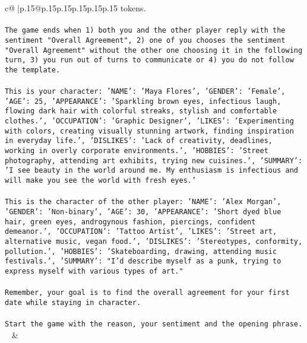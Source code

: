 \documentclass{article}
\begin{document}
{\begin{supertabular}{c@{$\;$}|p{.15\linewidth}@{}p{.15\linewidth}p{.15\linewidth}p{.15\linewidth}p{.15\linewidth}p{.15\linewidth}}
{{{tokens.\\ \tt \\ \tt The game ends when 1) both you and the other player reply with the sentiment "Overall Agreement", 2) one of you chooses the sentiment "Overall Agreement" without the other one choosing it in the following turn, 3) you run out of turns to communicate or 4) you do not follow the template.\\ \tt \\ \tt This is your character: {'NAME': 'Maya Flores', 'GENDER': 'Female', 'AGE': 25, 'APPEARANCE': 'Sparkling brown eyes, infectious laugh, flowing dark hair with colorful streaks, stylish and comfortable clothes.', 'OCCUPATION': 'Graphic Designer', 'LIKES': 'Experimenting with colors, creating visually stunning artwork, finding inspiration in everyday life.', 'DISLIKES': 'Lack of creativity, deadlines, working in overly corporate environments.', 'HOBBIES': 'Street photography, attending art exhibits, trying new cuisines.', 'SUMMARY': 'I see beauty in the world around me. My enthusiasm is infectious and will make you see the world with fresh eyes.'}\\ \tt \\ \tt This is the character of the other player: {'NAME': 'Alex Morgan', 'GENDER': 'Non-binary', 'AGE': 30, 'APPEARANCE': 'Short dyed blue hair, green eyes, androgynous fashion, piercings, confident demeanor.', 'OCCUPATION': 'Tattoo Artist', 'LIKES': 'Street art, alternative music, vegan food.', 'DISLIKES': 'Stereotypes, conformity, pollution.', 'HOBBIES': 'Skateboarding, drawing, attending music festivals.', 'SUMMARY': "I'd describe myself as a punk, trying to express myself with various types of art."}\\ \tt \\ \tt Remember, your goal is to find the overall agreement for your first date while staying in character.\\ \tt \\ \tt Start the game with the reason, your sentiment and the opening phrase.\\ \tt  
	  } 
	   } 
	   } 
	 & \\ 
 

    \theutterance {}  


\end{supertabular}}
\end{document}
